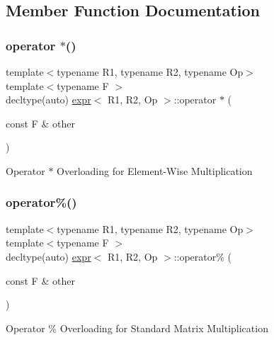 \subsection{Member Function Documentation}
\mbox{\label{classexpr_a7a78d4cfe0e97d19946a2ffb80882978}} 
\subsubsection{\texorpdfstring{operator $\ast$()}{operator *()}}
{\footnotesize\ttfamily template$<$typename R1, typename R2, typename Op$>$ \\
template$<$typename F $>$ \\
decltype(auto) \mbox{\hyperlink{classexpr}{expr}}$<$ R1, R2, Op $>$\+::operator $\ast$ (\begin{DoxyParamCaption}\item[{const F \&}]{other }\end{DoxyParamCaption})\hspace{0.3cm}{\ttfamily [inline]}}

Operator $\ast$ Overloading for Element-\/\+Wise Multiplication \mbox{\label{classexpr_abb42fe3353cc4446cf4cdae9e51ecb63}} 
\subsubsection{\texorpdfstring{operator\%()}{operator\%()}}
{\footnotesize\ttfamily template$<$typename R1, typename R2, typename Op$>$ \\
template$<$typename F $>$ \\
decltype(auto) \mbox{\hyperlink{classexpr}{expr}}$<$ R1, R2, Op $>$\+::operator\% (\begin{DoxyParamCaption}\item[{const F \&}]{other }\end{DoxyParamCaption})\hspace{0.3cm}{\ttfamily [inline]}}

Operator \% Overloading for Standard Matrix Multiplication \mbox{\label{classexpr_a095b81efbf9ed48db95750cd726460a2}} 
